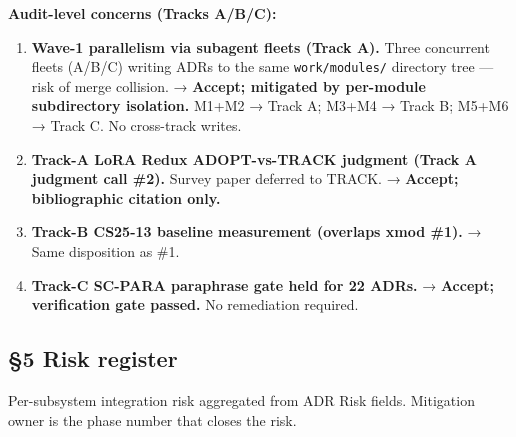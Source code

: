 \documentclass[11pt,letterpaper]{article}
\begin{document}
\textbf{Audit-level concerns (Tracks A/B/C):}

\begin{enumerate}
\def\labelenumi{\arabic{enumi}.}
\setcounter{enumi}{15}
\item
  \textbf{Wave-1 parallelism via subagent fleets (Track A).} Three
  concurrent fleets (A/B/C) writing ADRs to the same
  \texttt{work/modules/} directory tree --- risk of merge collision. →
  \textbf{Accept; mitigated by per-module subdirectory isolation.} M1+M2
  → Track A; M3+M4 → Track B; M5+M6 → Track C. No cross-track writes.
\item
  \textbf{Track-A LoRA Redux ADOPT-vs-TRACK judgment (Track A judgment
  call \#2).} Survey paper deferred to TRACK. → \textbf{Accept;
  bibliographic citation only.}
\item
  \textbf{Track-B CS25-13 baseline measurement (overlaps xmod \#1).} →
  Same disposition as \#1.
\item
  \textbf{Track-C SC-PARA paraphrase gate held for 22 ADRs.} →
  \textbf{Accept; verification gate passed.} No remediation required.
\end{enumerate}

\subsection{§5 Risk register}

Per-subsystem integration risk aggregated from ADR Risk fields.
Mitigation owner is the phase number that closes the risk.
\end{document}
